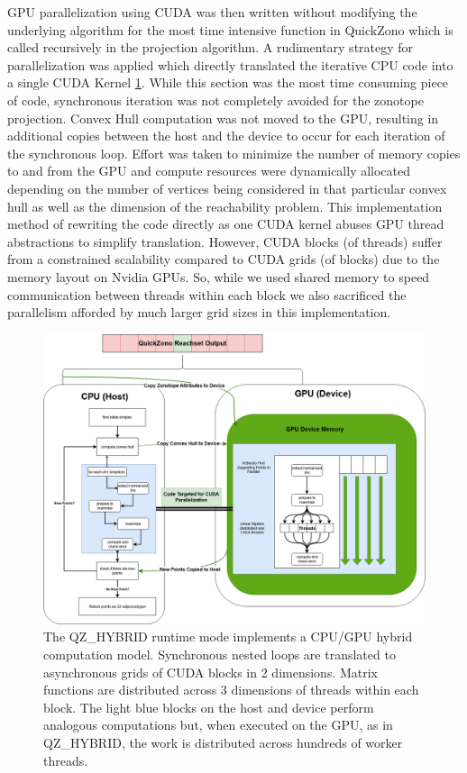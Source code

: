 \documentclass[runningheads]{llncs}
\begin{document}
GPU parallelization using CUDA was then written without modifying the underlying algorithm for the most time intensive function in QuickZono which is called recursively in the projection algorithm. A rudimentary strategy for parallelization was applied which directly translated the iterative CPU code into a single CUDA Kernel \ref{HybridComp}. While this section was the most time consuming piece of code, synchronous iteration was not completely avoided for the zonotope projection. Convex Hull computation was not moved to the GPU, resulting in additional copies between the host and the device to occur for each iteration of the synchronous loop. Effort was taken to minimize the number of memory copies to and from the GPU and compute resources were dynamically allocated depending on the number of vertices being considered in that particular convex hull as well as the dimension of the reachability problem. This implementation method of rewriting the code directly as one CUDA kernel abuses GPU thread abstractions to simplify translation. However, CUDA blocks (of threads) suffer from a constrained scalability compared to CUDA grids (of blocks) due to the memory layout on Nvidia GPUs. So, while we used shared memory to speed communication between threads within each block we also sacrificed the parallelism afforded by much larger grid sizes in this implementation.

\begin{figure}[t]
\includegraphics[width=\textwidth]{QZ_HYBRID_COMPUTATION.png}
\caption{The QZ\_HYBRID runtime mode implements a CPU/GPU hybrid computation model. Synchronous nested loops are translated to asynchronous grids of CUDA blocks in 2 dimensions. Matrix functions are distributed across 3 dimensions of threads within each block. The light blue blocks on the host and device perform analogous computations but, when executed on the GPU, as in QZ\_HYBRID, the work is distributed across hundreds of worker threads.} \label{HybridComp}
\end{figure}
\end{document}
